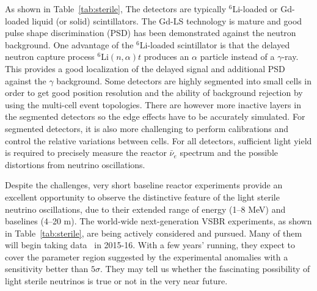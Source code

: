 As shown in Table~\ref{tab:sterile}, The detectors are typically $^{6}$Li-loaded or Gd-loaded liquid (or solid) scintillators. 
The Gd-LS technology is mature and good pulse shape discrimination (PSD) has been demonstrated against the neutron background. One advantage of the $^{6}$Li-loaded scintillator is that the delayed neutron capture process $^{6}$Li$(n,\alpha)t$ produces an $\alpha$ particle instead of a $\gamma$-ray. 
This provides a good localization of the delayed signal and additional PSD against the $\gamma$ background. 
Some detectors are highly segmented into small cells in order to get good position resolution and the ability of background rejection by using the multi-cell event topologies. 
There are however more inactive layers in the segmented detectors so the edge effects have to be accurately simulated.
For segmented detectors, it is also more challenging to perform calibrations and control the relative variations between cells. 
For all detectors, sufficient light yield is required to precisely measure the reactor $\bar\nu_e$ spectrum and the possible distortions from neutrino oscillations.


Despite the challenges, very short baseline reactor experiments provide an excellent opportunity to observe the distinctive feature of the light sterile neutrino oscillations, due to their extended range of energy (1--8 MeV) and baselines (4--20 m). 
The world-wide next-generation VSBR experiments, as shown in Table~\ref{tab:sterile}, are being actively considered and pursued.
Many of them will begin taking data~\cite{Lhuillier-Neutrino14} in 2015-16. With a few years' running, they expect to cover the parameter region suggested by the experimental anomalies with a sensitivity better than $5\sigma$. 
They may tell us whether the fascinating possibility of light sterile neutrinos is true or not in the very near future.

